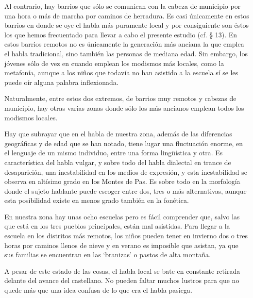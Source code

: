Al contrario, hay barrios que sólo se comunican con la cabeza de municipio por una hora o más de marcha por caminos de herradura. Es casi únicamente en estos barrios en donde se oye el habla más puramente local y por consiguiente son éstos los que hemos frecuentado para llevar a cabo el presente estudio (cf. § 13). En estos barrios remotos no es únicamente la generación más anciana
la que emplea el habla tradicional, sino también las personas de mediana edad. Sin embargo, los jóvenes sólo de vez en cuando emplean los modismos más locales, como la metafonía, aunque a los niños que todavía no han asistido a la escuela sí se les puede oír alguna palabra inflexionada.

Naturalmente, entre estos dos extremos, de barrios muy remotos y cabezas de municipio, hay otras varias zonas donde sólo los más ancianos emplean todos los modismos locales. 

Hay que subrayar que en el habla de nuestra zona, además de las diferencias geográficas y de edad que se han notado, tiene lugar una fluctuación enorme, en el lenguaje de un mismo individuo, entre una forma lingüística y otra. Es característica del habla vulgar, y sobre todo del habla dialectal en trance de desaparición, una inestabilidad en los medios de expresión, y esta inestabilidad se observa en altísimo grado en los Montes de Pas. Es sobre todo en la morfología donde el sujeto hablante puede escoger entre dos, tres o más alternativas, aunque esta posibilidad existe en menos grado también en la fonética.

En nuestra zona hay unas ocho escuelas pero es fácil comprender que, salvo las que está en los tres pueblos principales, están mal asistidas. Para llegar a la escuela en los distritos más remotos, los niños pueden tener en invierno dos o tres horas por caminos llenos de nieve y en verano es imposible que asistan, ya que sus familias se encuentran en las `branizas' o pastos de alta montaña. 

A pesar de este estado de las cosas, el habla local se bate en constante retirada delante del avance del castellano. No pueden faltar muchos lustros para que no quede más que una idea confusa de lo que era el habla pasiega. 


